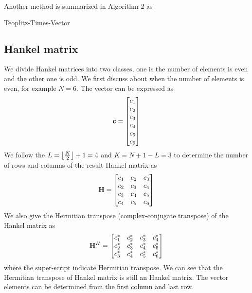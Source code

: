 \documentclass[revised,endfloat]{geophysics}
\DeclarePairedDelimiter\floor{\lfloor}{\rfloor}
\begin{document}
Another method is summarized in Algorithm 2 as 
\begin{algorithm}
      \SetAlgoLined
      \caption{Teoplitz-Times-Vector}
\end{algorithm}

\subsection{Hankel matrix}
We divide Hankel matrices into two classes, one is the number of elements is even and the other one is odd. We first discuss about when the number of elements is even, for example $N=6$. The vector can be expressed as
$${\bf c} = \begin{bmatrix}
c_1\\
c_2\\
c_3\\
c_4\\
c_5\\
c_6\\
\end{bmatrix}$$ 
We follow the $L = \floor*{\frac{N}{2}}+1 = 4$ and $K = N+1-L = 3$ to determine the number of rows and columns of the result Hankel matrix as
\begin{equation}
{\bf H} = 
\begin{bmatrix}
c_1 & c_2 & c_3 \\ 
c_2 & c_3 & c_4 \\ 
c_3 & c_4 & c_5 \\ 
c_4 & c_5 & c_6 \\ 
\end{bmatrix}
\label{eq23}
\end{equation}
We also give the Hermitian transpose (complex-conjugate transpose) of the Hankel matrix as
\begin{equation}
{\bf H}^H = 
\begin{bmatrix}
c_1^*  & c_2^*  & c_3^*  & c_4^*  \\ 
c_2^*  & c_3^*  & c_4^*  & c_5^*  \\ 
c_3^*  & c_4^*  & c_5^*  & c_6^*  \\ 
\end{bmatrix}
\label{eq24}
\end{equation}
where the super-script indicate Hermitian transpose.
We can see that the Hermitian transpose of Hankel matrix is still an Hankel matrix. The vector elements can be determined from the first column and last row. 
\end{document}
